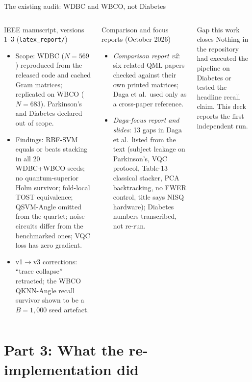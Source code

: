 \documentclass[aspectratio=169,10pt,t,xcolor={table}]{beamer}
\begin{document}
\begin{frame}{The existing audit: WDBC and WBCO, not Diabetes}
\begin{columns}[T]
\begin{block}{IEEE manuscript, versions 1--3 (\texttt{latex\_report/})}
\begin{itemize}\footnotesize
  \item Scope: WDBC ($N=569$) reproduced from the released code and cached Gram matrices; replicated on WBCO ($N=683$). Parkinson's and Diabetes declared out of scope.
  \item Findings: RBF-SVM equals or beats stacking in all 20 WDBC+WBCO seeds; no quantum-superior Holm survivor; fold-local TOST equivalence; QSVM-Angle omitted from the quartet; noise circuits differ from the benchmarked ones; VQC loss has zero gradient.
  \item v1$\to$v3 corrections: ``trace collapse'' retracted; the WBCO QKNN-Angle recall survivor shown to be a $B{=}1{,}000$ seed artefact.
\end{itemize}
\end{block}
\begin{block}{Comparison and focus reports (October 2026)}
\begin{itemize}\footnotesize
  \item \emph{Comparison report v2}: six related QML papers checked against their own printed matrices; Daga et al.\ used only as a cross-paper reference.
  \item \emph{Daga-focus report and slides}: 13 gaps in Daga et al.\ listed from the text (subject leakage on Parkinson's, VQC protocol, Table-13 classical stacker, PCA backtracking, no FWER control, title says NISQ hardware); Diabetes numbers transcribed, not re-run.
\end{itemize}
\end{block}
\begin{alertblock}{Gap this work closes}
\footnotesize Nothing in the repository had executed the pipeline on Diabetes or tested the headline recall claim. This deck reports the first independent run.
\end{alertblock}
\end{columns}
\end{frame}

\section{Part 3: What the re-implementation did}
\end{document}
